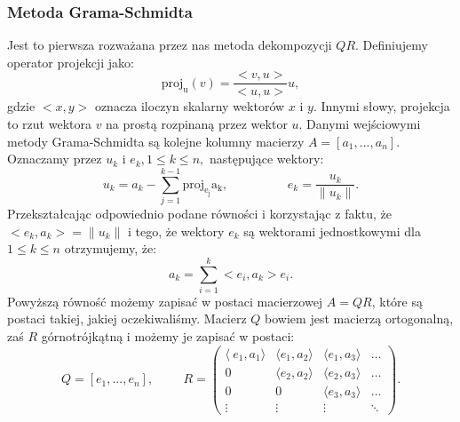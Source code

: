 \subsubsection{Metoda Grama-Schmidta}
Jest to pierwsza rozważana przez nas metoda dekompozycji $QR$. Definiujemy
operator projekcji jako:
$$\mathrm{proj_u}(v)=\frac{<v,u>}{<u,u>}u,$$
gdzie $<x,y>$ oznacza iloczyn skalarny wektorów $x$ i $y$. Innymi słowy, projekcja
to rzut wektora $v$ na prostą rozpinaną przez wektor $u$. Danymi wejściowymi
metody Grama-Schmidta są kolejne kolumny macierzy $A=[a_1,...,a_n]$.
Oznaczamy przez ${u_k}$ i ${e_k}, 1 \leq k \leq n,$ następujące wektory:
$$ u_k = a_k-\sum_{j=1}^{k-1} \mathrm{proj_{e_j}a_k}, \hspace{2cm}
e_k = \frac{u_k}{\|u_k\|}.$$
Przekształcając odpowiednio podane równości i korzystając z faktu, że
$<e_k, a_k> = \|u_k\|$ i tego, że wektory $e_k$ są wektorami jednostkowymi dla
$1 \leq k \leq n$ otrzymujemy, że:
$$ a_k = \sum_{i=1}^{k} <e_i,a_k>e_i.$$
Powyższą równość możemy zapisać w postaci macierzowej $A=QR$, które są
postaci takiej, jakiej oczekiwaliśmy. Macierz $Q$ bowiem jest macierzą ortogonalną,
zaś $R$ górnotrójkątną i możemy je zapisać w postaci:
$$ Q = [e_1,...,e_n], \hspace{1cm} R = \begin{pmatrix} \langle\ e_1,a_1
\rangle & \langle e_1,a_2\rangle & \langle e_1, a_3\rangle & \ldots \\ 0
& \langle e_2, a_2\rangle & \langle e_2, a_3\rangle & \ldots \\ 0 & 0 &
\langle e_3, a_3\rangle & \ldots \\ \vdots & \vdots & \vdots & \ddots
\end{pmatrix}.$$
